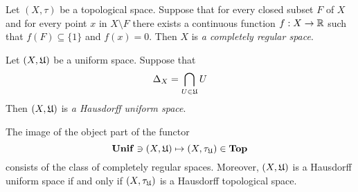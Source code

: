 \begin{definition}
Let $(X,\tau)$ be a topological space. Suppose that for every closed subset $F$ of $X$ and for every point $x$ in $X\setminus  F$ there exists a continuous function $f:X\rightarrow {\mathbb R}$ such that $f(F) \subseteq \{1\}$ and $f(x) = 0$. Then $X$ is \textit{a completely regular space}. 
\end{definition}

\begin{definition}
Let $(X,{\mathfrak U})$ be a uniform space. Suppose that
$$\Delta_X = \bigcap_{U\in {\mathfrak U}}U$$
Then $(X,{\mathfrak U})$ is \textit{a Hausdorff uniform space}.
\end{definition}

\begin{theorem}\label{theorem:image_of_the_canonical_functor_is_completely_regular_space}
The image of the object part of the functor
$$\mathbf{Unif} \ni (X,{\mathfrak U}) \mapsto (X,\tau_{{\mathfrak U}}) \in \mathbf{Top}$$
consists of the class of completely regular spaces. Moreover, $\left(X,{\mathfrak U}\right)$ is a Hausdorff uniform space if and only if $\left(X,\tau_{{\mathfrak U}}\right)$ is a Hausdorff topological space. 
\end{theorem}
